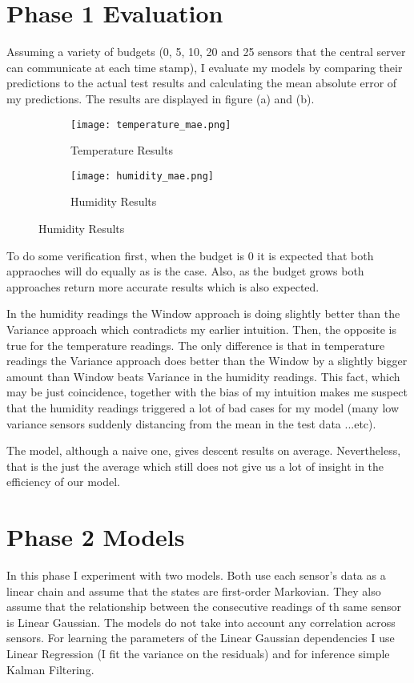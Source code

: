 \documentclass{article}
\begin{document}
\section{Phase 1 Evaluation}

Assuming a variety of budgets (0, 5, 10, 20 and 25
sensors that the central server can communicate at
each time stamp), I evaluate my models by comparing
their predictions to the actual test results and
calculating the mean absolute error of my
predictions. The results are displayed in figure (a)
and (b).

\begin{figure}[h!]
	\begin{subfigure}{\linewidth}
	\texttt{[image: temperature\_mae.png]}
	\caption{Temperature Results}
	\end{subfigure}
	\begin{subfigure}{\linewidth}
	\texttt{[image: humidity\_mae.png]}
	\caption{Humidity Results}
	\end{subfigure}
\end{figure}

\newpage

To do some verification first, when the budget is 0
it is expected that both appraoches will do equally
as is the case. Also, as the budget grows both
approaches return more accurate results which is
also expected.

In the humidity readings the Window approach is
doing slightly better than the Variance approach
which contradicts my earlier intuition. Then, the
opposite is true for the temperature readings.
The only difference is that in temperature readings
the Variance approach does better than the Window
by a slightly bigger amount than Window beats Variance
in the humidity readings. This fact, which may
be just coincidence, together with the bias of
my intuition makes me suspect that the humidity
readings triggered a lot of bad cases for my
model (many low variance sensors suddenly distancing
from the mean in the test data ...etc).

The model, although a naive one, gives descent
results on average. Nevertheless, that is the just
the average which still does not give us a lot of
insight in the efficiency of our model.

\section{Phase 2 Models}

In this phase I experiment with two models. Both use
each sensor's data as a linear chain and assume that
the states are first-order Markovian. They also
assume that the relationship between the consecutive
readings of th same sensor is Linear Gaussian. The
models do not take into account any correlation
across sensors. For learning the parameters of the
Linear Gaussian dependencies I use Linear Regression
(I fit the variance on the residuals) and for inference
simple Kalman Filtering.
\end{document}
